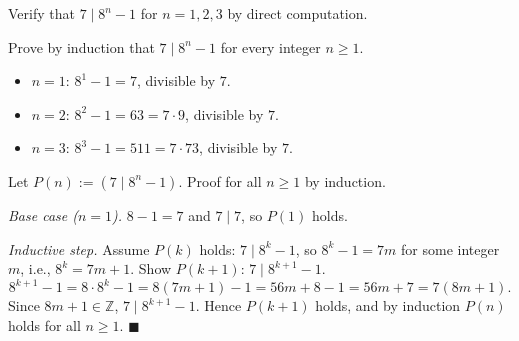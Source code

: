 \documentclass[test,letterpaper]{cs20}
\begin{document}
\begin{problem}

\subproblem Verify that $7 \mid 8^n - 1$ for $n = 1, 2, 3$ by direct computation.

\subproblem Prove by induction that $7 \mid 8^n - 1$ for every integer $n \geq 1$.

\begin{solution}
\subsolution
\begin{itemize}
\item $n = 1$: $8^1 - 1 = 7$, divisible by $7$.
\item $n = 2$: $8^2 - 1 = 63 = 7 \cdot 9$, divisible by $7$.
\item $n = 3$: $8^3 - 1 = 511 = 7 \cdot 73$, divisible by $7$.
\end{itemize}

\subsolution
Let $P(n) := (7 \mid 8^n - 1)$. Proof for all $n \geq 1$ by induction.

\emph{Base case ($n = 1$).} $8 - 1 = 7$ and $7 \mid 7$, so $P(1)$ holds.

\emph{Inductive step.} Assume $P(k)$ holds: $7 \mid 8^k - 1$, so $8^k - 1 = 7m$ for some integer $m$, i.e., $8^k = 7m + 1$. Show $P(k+1)$: $7 \mid 8^{k+1} - 1$.
\[
8^{k+1} - 1 = 8 \cdot 8^k - 1 = 8(7m + 1) - 1 = 56 m + 8 - 1 = 56 m + 7 = 7(8 m + 1).
\]
Since $8m + 1 \in \mathbb{Z}$, $7 \mid 8^{k+1} - 1$. Hence $P(k + 1)$ holds, and by induction $P(n)$ holds for all $n \geq 1$. $\blacksquare$
\end{solution}

\pagebreak

\end{problem}
\end{document}
